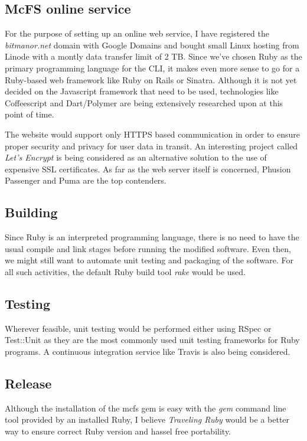 \subsection{McFS online service}
For the purpose of setting up an online web service, I have registered the \emph{bitmanor.net} domain with Google Domains and bought small Linux hosting from Linode with a montly data transfer limit of 2 TB. Since we've chosen Ruby as the primary programming language for the CLI, it makes even more sense to go for a Ruby-based web framework like Ruby on Rails\cite{site:rubyonrails} or Sinatra\cite{sinatra}. Although it is not yet decided on the Javascript framework that need to be used, technologies like Coffeescript\cite{site:coffeescript} and Dart/Polymer\cite{site:dartlang} are being extensively researched upon at this point of time.

The website would support only HTTPS based communication in order to ensure proper security and privacy for user data in transit. An interesting project called \emph{Let's Encrypt}\cite{site:letsencrypt} is being considered as an alternative solution to the use of expensive SSL certificates. As far as the web server itself is concerned, Phusion Passenger\cite{site:phusion} and Puma\cite{site:puma} are the top contenders.

\subsection{Building}
Since Ruby is an interpreted programming language, there is no need to have the usual compile and link stages before running the modified software. Even then, we might still want to automate unit testing and packaging of the software. For all such activities, the default Ruby build tool \emph{rake} would be used.

\subsection{Testing}

Wherever feasible, unit testing would be performed either using RSpec or Test::Unit as they are the most commonly used unit testing frameworks for Ruby programs. A continuous integration service like Travis\cite{site:travisci} is also being considered.

\subsection{Release}
Although the installation of the mcfs gem is easy with the \emph{gem} command line tool provided by an installed Ruby, I believe \emph{Traveling Ruby}\cite{site:travelingruby} would be a better way to ensure correct Ruby version and hassel free portability.

